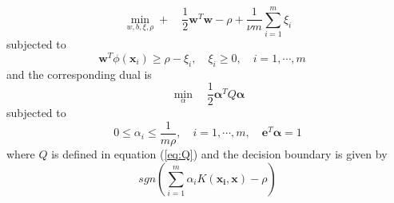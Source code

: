 \documentclass[../Main/thesis.tex]{subfiles}
\begin{document}
 \begin{equation}
 \min_{w,b,\xi,\rho} +\quad \frac{1}{2}\bm{w}^{T}\bm{w}- \rho + \frac{1}{\nu m}\sum_{i = 1}^{m}\xi_{i}
 \end{equation}
 subjected to 
 \begin{equation}
 \bm{w}^{T}\phi(\bm{x}_{i}) \geq \rho - \xi_{i}, \quad \xi_{i} \geq 0, \quad i = 1,\cdots,m \quad
 \end{equation}
 and the corresponding dual is 
 \begin{equation}\label{eq:onedual1}
 \min_{\alpha}\quad \frac{1}{2}\bm{\alpha}^{T}Q\bm{\alpha}
 \end{equation}
 subjected to 
 \begin{equation}\label{eq:onedual2}
 0 \leq \alpha_{i} \leq \frac{1}{m\rho},\quad  i = 1,\cdots, m, \quad \bm{e}^{T}\bm{\alpha} = 1
 \end{equation}
 where $Q$ is defined in equation (\ref{eq:Q}) and the decision boundary is given by
 \begin{equation}
 sgn\left(  \sum_{i=1}^{m}\alpha_{i}K(\bm{x_{i}},\bm{x}) -\rho \right)
 \end{equation}
 
\end{document}
